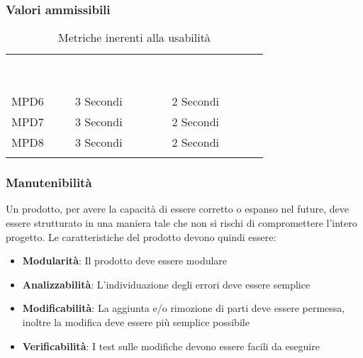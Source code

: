 \subsubsection{Valori ammissibili}
\renewcommand{\arraystretch}{1.5}
\begin{longtable}{p{0.12\linewidth}p{0.30\linewidth}p{0.30\linewidth}}
	\rowcolor[RGB]{33, 73, 50}
	\textcolor{white}{\textbf{Metrica}} & \textcolor{white}{\textbf{Valore accettabile}} & \textcolor{white}{\textbf{Valore ottimale}}\\
    \rowcolor[RGB]{216, 235, 171}
    MPD6 & 3 Secondi & 2 Secondi\\ 
    \rowcolor[RGB]{233, 245, 206}
    MPD7 & 3 Secondi & 2 Secondi\\
    \rowcolor[RGB]{216, 235, 171}
    MPD8 & 3 Secondi & 2 Secondi\\ 
    \caption{Metriche inerenti alla usabilità}
\end{longtable}	
\subsubsection{Manutenibilità}
Un prodotto, per avere la capacità di essere corretto o espanso nel future, deve essere strutturato in una maniera tale che non si rischi di compromettere
l'intero progetto. Le caratteristiche del prodotto devono quindi essere:
\begin{itemize}
    \item \textbf{Modularità}: Il prodotto deve essere modulare
    \item \textbf{Analizzabilità}: L'individuazione degli errori deve essere semplice
    \item \textbf{Modificabilità}: La aggiunta e/o rimozione di parti deve essere permessa, inoltre la modifica deve essere più semplice possibile
    \item \textbf{Verificabilità}: I test sulle modifiche devono essere facili da eseguire
\end{itemize}
